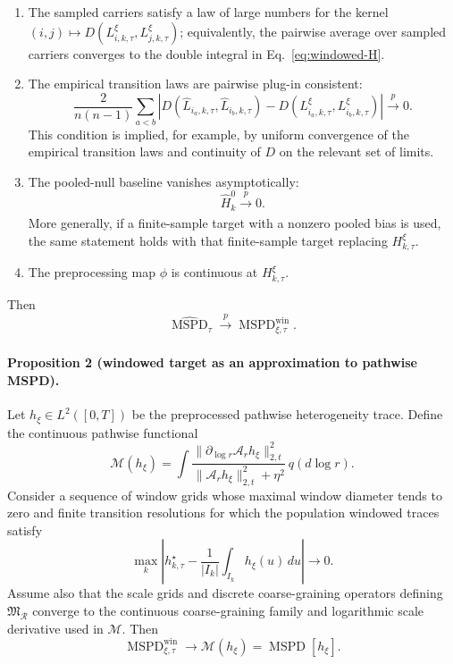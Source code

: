 \begin{enumerate}
  \item The sampled carriers satisfy a law of large numbers for the kernel \((i,j)\mapsto D(L_{i,k,\tau}^{\xi},L_{j,k,\tau}^{\xi})\); equivalently, the pairwise average over sampled carriers converges to the double integral in Eq.~\eqref{eq:windowed-H}.
  \item The empirical transition laws are pairwise plug-in consistent:
  \[
    \frac{2}{n(n-1)}
    \sum_{a<b}
    \left|
      D(\widehat L_{i_a,k,\tau},\widehat L_{i_b,k,\tau})
      -
      D(L_{i_a,k,\tau}^{\xi},L_{i_b,k,\tau}^{\xi})
    \right|
    \xrightarrow[]{p}0.
  \]
  This condition is implied, for example, by uniform convergence of the empirical transition laws and continuity of \(D\) on the relevant set of limits.
  \item The pooled-null baseline vanishes asymptotically:
  \[
    \widehat H_k^0\xrightarrow[]{p}0.
  \]
  More generally, if a finite-sample target with a nonzero pooled bias is used, the same statement holds with that finite-sample target replacing \(H_{k,\tau}^{\xi}\).
  \item The preprocessing map \(\phi\) is continuous at \(H_{k,\tau}^{\xi}\).
\end{enumerate}
Then
\begin{equation}
\widehat{\operatorname{MSPD}}_{\tau}
  \xrightarrow[]{p}
  \operatorname{MSPD}^{\mathrm{win}}_{\xi,\tau}.
  \label{eq:empirical-to-windowed-consistency}
\end{equation}

\paragraph{Proposition 2 (windowed target as an approximation to pathwise MSPD).}
Let \(h_\xi\in L^2([0,T])\) be the preprocessed pathwise heterogeneity trace.  Define the continuous pathwise functional
\[
\mathcal M(h_\xi)
  =
  \int
  \frac{
    \|\partial_{\log r}\mathcal A_r h_\xi\|_{2,t}^{2}
  }{
    \|\mathcal A_r h_\xi\|_{2,t}^{2}+\eta^2
  }
  \,q(d\log r).
\]
Consider a sequence of window grids whose maximal window diameter tends to zero and finite transition resolutions for which the population windowed traces satisfy
\begin{equation}
\max_k
\left|
  h_{k,\tau}^{\star}
  -
  \frac{1}{|I_k|}\int_{I_k}h_\xi(u)\,du
\right|
  \longrightarrow 0.
  \label{eq:local-stationarity-condition}
\end{equation}
Assume also that the scale grids and discrete coarse-graining operators defining \(\mathfrak M_{\mathcal R}\) converge to the continuous coarse-graining family and logarithmic scale derivative used in \(\mathcal M\).  Then
\begin{equation}
\operatorname{MSPD}^{\mathrm{win}}_{\xi,\tau}
  \longrightarrow
  \mathcal M(h_\xi)
  =
  \operatorname{MSPD}[h_\xi].
  \label{eq:windowed-to-pathwise-consistency}
\end{equation}

